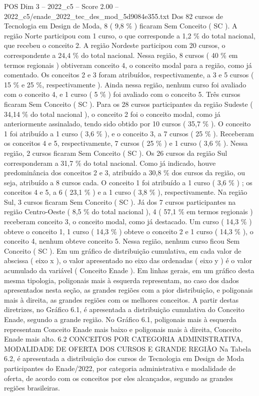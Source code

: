 \begin{textsample}{POS Dim 3 – 2022\_c5 – Score 2.00 – 2022\_c5/enade\_2022\_tec\_des\_mod\_5d9084e355.txt}
Dos 82 cursos de Tecnologia em Design de Moda, 8 ( 9,8 \% ) ficaram Sem Conceito ( SC ).
A região Norte participou com 1 curso, o que corresponde a 1,2 \% do total nacional, que recebeu o conceito 2.
A região Nordeste participou com 20 cursos, o correspondente a 24,4 \% do total nacional.
Nessa região, 8 cursos ( 40 \% em termos regionais ) obtiveram conceito 4, o conceito modal para a região, como já comentado.
Os conceitos 2 e 3 foram atribuídos, respectivamente, a 3 e 5 cursos ( 15 \% e 25 \%, respectivamente ).
Ainda nessa região, nenhum curso foi avaliado com o conceito 4, e 1 curso ( 5 \% ) foi avaliado com o conceito 5.
Três cursos ficaram Sem Conceito ( SC ).
Para os 28 cursos participantes da região Sudeste ( 34,14 \% do total nacional ), o conceito 2 foi o conceito modal, como já anteriormente assinalado, tendo sido obtido por 10 cursos ( 35,7 \% ).
O conceito 1 foi atribuído a 1 curso ( 3,6 \% ), e o conceito 3, a 7 cursos ( 25 \% ).
Receberam os conceitos 4 e 5, respectivamente, 7 cursos ( 25 \% ) e 1 curso ( 3,6 \% ).
Nessa região, 2 cursos ficaram Sem Conceito ( SC ).
Os 26 cursos da região Sul corresponderam a 31,7 \% do total nacional.
Como já indicado, houve predominância dos conceitos 2 e 3, atribuído a 30,8 \% dos cursos da região, ou seja, atribuído a 8 cursos cada.
O conceito 1 foi atribuído a 1 curso ( 3,6 \% ) ; os conceitos 4 e 5, a 6 ( 23,1 \% ) e a 1 curso ( 3,8 \% ), respectivamente.
Na região Sul, 3 cursos ficaram Sem Conceito ( SC ).
Já dos 7 cursos participantes na região Centro-Oeste ( 8,5 \% do total nacional ), 4 ( 57,1 \% em termos regionais ) receberam conceito 3, o conceito modal, como já destacado.
Um curso ( 14,3 \% ) obteve o conceito 1, 1 curso ( 14,3 \% ) obteve o conceito 2 e 1 curso ( 14,3 \% ), o conceito 4, nenhum obteve conceito 5.
Nessa região, nenhum curso ficou Sem Conceito ( SC ).
Em um gráfico de distribuição cumulativa, em cada valor de abscissa ( eixo x ), o valor apresentado no eixo das ordenadas ( eixo y ) é o valor acumulado da variável ( Conceito Enade ).
Em linhas gerais, em um gráfico desta mesma tipologia, poligonais mais à esquerda representam, no caso dos dados apresentados nesta seção, as grandes regiões com a pior distribuição, e poligonais mais à direita, as grandes regiões com os melhores conceitos.
A partir destas diretrizes, no Gráfico 6.1, é apresentada a distribuição cumulativa do Conceito Enade, segundo a grande região.
No Gráfico 6.1, poligonais mais à esquerda representam Conceito Enade mais baixo e poligonais mais à direita, Conceito Enade mais alto. 6.2 CONCEITOS POR CATEGORIA ADMINISTRATIVA, MODALIDADE DE OFERTA DOS CURSOS E GRANDE REGIÃO Na Tabela 6.2, é apresentada a distribuição dos cursos de Tecnologia em Design de Moda participantes do Enade/2022, por categoria administrativa e modalidade de oferta, de acordo com os conceitos por eles alcançados, segundo as grandes regiões brasileiras.

\end{textsample}
